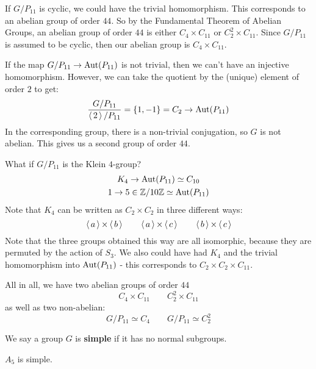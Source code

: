 If $ G/P_{11} $ is cyclic, we could have the trivial homomorphism.
This corresponds to an abelian group of order $ 44 $.
So by the Fundamental Theorem of Abelian Groups, an abelian group of order $ 44 $
is either $ C_{4} \times C_{11} $ or $ C_{2}^{2} \times C_{11} $.
Since $ G/P_{11} $ is assumed to be cyclic, then our abelian group is $ C_{4} \times C_{11} $.

If the map $ G/P_{11} \rightarrow \operatorname{Aut}(P_{11}) $ is not trivial, then we can't have an
injective homomorphism. However, we can take the quotient by the (unique) element of order $ 2 $
to get:
\begin{equation*}
    \frac{G/P_{11}}{\operatorname{\langle} 2 \operatorname{\rangle}/P_{11}} = \left\{{1, -1}\right\} = C_{2} \rightarrow \operatorname{Aut}(P_{11})
\end{equation*}
In the corresponding group, there is a non-trivial conjugation, so $ G $ is not abelian.
This gives us a second group of order $ 44 $. \npgh

What if $ G/P_{11} $ is the Klein $ 4 $-group?
\begin{gather*}
    K_{4} \rightarrow \operatorname{Aut}(P_{11}) \simeq C_{10} \\
    1 \rightarrow 5 \in \mathbb{Z}/10\mathbb{Z} \simeq \operatorname{Aut}(P_{11})
\end{gather*}
Note that $ K_{4} $ can be written as $ C_{2} \times C_{2} $ in three different ways:
\begin{equation*}
    \operatorname{\langle} a \operatorname{\rangle} \times \operatorname{\langle} b \operatorname{\rangle} \qquad \operatorname{\langle} a \operatorname{\rangle} \times \operatorname{\langle} c \operatorname{\rangle} \qquad \operatorname{\langle} b \operatorname{\rangle} \times \operatorname{\langle} c \operatorname{\rangle}
\end{equation*}
Note that the three groups obtained this way are all isomorphic, because they are permuted by
the action of $ S_{3} $.
We also could have had $ K_{4} $ and the trivial homomorphism into $ \operatorname{Aut}(P_{11}) $ - this
corresponds to $ C_{2} \times C_{2} \times C_{11} $.

All in all, we have two abelian groups of order $ 44 $
\begin{equation*}
    C_{4} \times C_{11} \qquad C_{2}^{2} \times C_{11}
\end{equation*}
as well as two non-abelian:
\begin{equation*}
    G/P_{11} \simeq C_{4} \qquad G/P_{11} \simeq C_{2}^{2}
\end{equation*}

\begin{defn}
    We say a group $ G $ is \textbf{simple} if it has no normal subgroups.
\end{defn}

\begin{crll}
    $ A_{5} $ is simple.
\end{crll}

